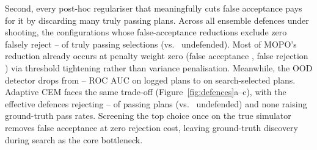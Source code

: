 Second, every post-hoc regulariser that meaningfully cuts false acceptance pays for it by discarding many truly passing plans. Across all \DefEnsTestedN{} ensemble defences under shooting, the \DefSigN{} configurations whose false-acceptance reductions exclude zero falsely reject \DefSigFalseRejMin{}--\DefSigFalseRejMax{} of truly passing selections (vs.\ \DefEnsFalseRej{} undefended). Most of MOPO's reduction already occurs at penalty weight zero (false acceptance \DefPenZeroHack{}, false rejection \DefPenZeroFalseRej{}) via threshold tightening rather than variance penalisation. Meanwhile, the OOD detector drops from \DetAucMin{}--\DetAucMax{} ROC AUC on logged plans to \DetSelAuc{} \ci{\DetSelAucCI} on search-selected plans. Adaptive CEM faces the same trade-off (Figure~\ref{fig:defences}a--c), with the \DefAdSigN{} effective defences rejecting \DefAdSigFalseRejMin{}--\DefAdSigFalseRejMax{} of passing plans (vs.\ \DefAdEnsFalseRej{} undefended) and none raising ground-truth pass rates. Screening the top choice once on the true simulator removes false acceptance at zero rejection cost, leaving ground-truth discovery during search as the core bottleneck.
